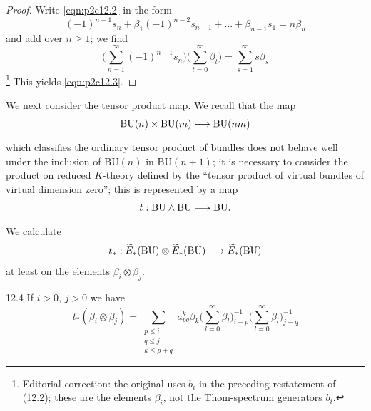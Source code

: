 \documentclass[../main]{subfiles}
\begin{document}
\begin{proof}
Write \eqref{eqn:p2c12.2} in the form \[(-1)^{n-1}s_n + \beta_1(-1)^{n-2}s_{n-1} + \dots + \beta_{n-1} s_1 = n\beta_n\]
and add over $n\ge 1$; we find \[\bigg(\sum^\infty_{n=1}(-1)^{n-1} s_n \bigg)\bigg(\sum^\infty_{t=0}\beta_t\bigg) = \sum^\infty_{s=1}s\beta_s\]
\footnote{Editorial correction: the original uses $b_i$ in the preceding restatement of (12.2); these are the elements $\beta_i$, not the Thom-spectrum generators $b_i$.}
This yields \eqref{eqn:p2c12.3}.
\end{proof}
We next consider the tensor product map. We recall that the map \[ \mathrm{BU}(n)\times \mathrm{BU}(m)\vra{} \mathrm{BU}(nm)\]
which classifies the ordinary tensor product of bundles does not behave well under the inclusion of $ \mathrm{BU}(n)$ in $\mathrm{BU}(n+1)$; it is necessary to consider the product on reduced $K$-theory defined by the ``tensor product of virtual bundles of virtual dimension zero''; this is represented by a map \[t: \mathrm{BU}\wedge \mathrm{BU}\vra{} \mathrm{BU}.\]
We calculate \[t_\ast : \widetilde{E}_\ast(\mathrm{BU})\otimes\widetilde{E}_\ast(\mathrm{BU})\longrightarrow\widetilde{E}_\ast(\mathrm{BU})\] at least on the elements $\beta_i\otimes\beta_j$.
\begin{customprop}{12.4}
\label{prop:p2c12.4}
If $i>0$, $j>0$ we have \begin{equation*}
t_\ast(\beta_i\otimes\beta_j)=\sum_{\substack{p\le i\\ q\le j\\ k\le p+q}} a^k_{pq}\beta_k \bigg(\sum^\infty_{l=0}\beta_l\bigg)^{-1}_{i-p}\bigg(\sum^\infty_{l=0}\beta_l\bigg)^{-1}_{j-q}
\end{equation*}
\end{customprop}
\end{document}

